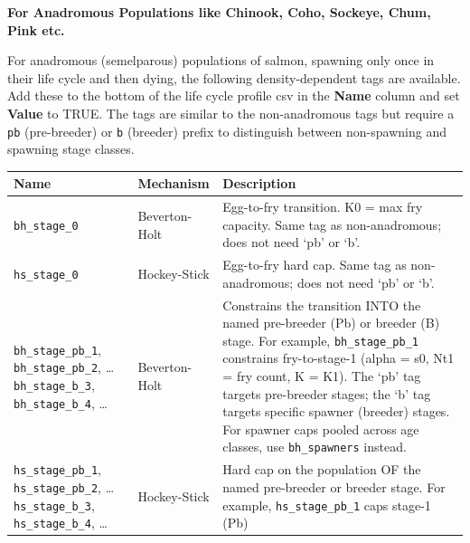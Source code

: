\documentclass[
  letterpaper,
  DIV=11,
  numbers=noendperiod]{scrreprt}
\begin{document}
\textbf{For Anadromous Populations like Chinook, Coho, Sockeye, Chum,
Pink etc.}

For anadromous (semelparous) populations of salmon, spawning only once
in their life cycle and then dying, the following density-dependent tags
are available. Add these to the bottom of the life cycle profile csv in
the \textbf{Name} column and set \textbf{Value} to TRUE. The tags are
similar to the non-anadromous tags but require a \texttt{pb}
(pre-breeder) or \texttt{b} (breeder) prefix to distinguish between
non-spawning and spawning stage classes.

\begin{longtable}[]{@{}
  >{\raggedright\arraybackslash}p{}
  >{\raggedright\arraybackslash}p{}
  >{\raggedright\arraybackslash}p{}@{}}
\toprule\noalign{}
\begin{minipage}[b]{\linewidth}\raggedright
Name
\end{minipage} & \begin{minipage}[b]{\linewidth}\raggedright
Mechanism
\end{minipage} & \begin{minipage}[b]{\linewidth}\raggedright
Description
\end{minipage} \\
\midrule\noalign{}
\endhead
\bottomrule\noalign{}
\endlastfoot
\texttt{bh\_stage\_0} & Beverton-Holt & Egg-to-fry transition. K0 = max
fry capacity. Same tag as non-anadromous; does not need `pb' or `b'. \\
\texttt{hs\_stage\_0} & Hockey-Stick & Egg-to-fry hard cap. Same tag as
non-anadromous; does not need `pb' or `b'. \\
\texttt{bh\_stage\_pb\_1}, \texttt{bh\_stage\_pb\_2}, \ldots{}
\texttt{bh\_stage\_b\_3}, \texttt{bh\_stage\_b\_4}, \ldots{} &
Beverton-Holt & Constrains the transition INTO the named pre-breeder
(Pb) or breeder (B) stage. For example, \texttt{bh\_stage\_pb\_1}
constrains fry-to-stage-1 (alpha = s0, Nt1 = fry count, K = K1). The
`pb' tag targets pre-breeder stages; the `b' tag targets specific
spawner (breeder) stages. For spawner caps pooled across age classes,
use \texttt{bh\_spawners} instead. \\
\texttt{hs\_stage\_pb\_1}, \texttt{hs\_stage\_pb\_2}, \ldots{}
\texttt{hs\_stage\_b\_3}, \texttt{hs\_stage\_b\_4}, \ldots{} &
Hockey-Stick & Hard cap on the population OF the named pre-breeder or
breeder stage. For example, \texttt{hs\_stage\_pb\_1} caps stage-1 (Pb)

\end{longtable}
\end{document}
